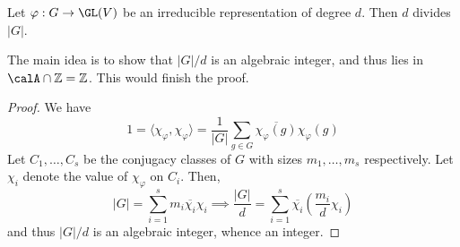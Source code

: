 \begin{theorem}
    Let $\varphi: G\to\GL(V)$ be an irreducible representation of degree $d$. Then $d$ divides $|G|$.
\end{theorem}
The main idea is to show that $|G|/d$ is an algebraic integer, and thus lies in $\calA\cap\Z = \Z$. This would finish the proof.
\begin{proof}
    We have 
    \begin{equation*}
        1 = \langle\chi_\varphi,\chi_\varphi\rangle = \frac{1}{|G|}\sum_{g\in G}\overline{\chi_\varphi(g)}\chi_\varphi(g)
    \end{equation*}
    Let $C_1,\ldots,C_s$ be the conjugacy classes of $G$ with sizes $m_1,\ldots,m_s$ respectively. Let $\chi_i$ denote the value of $\chi_\varphi$ on $C_i$. Then,
    \begin{equation*}
        |G| = \sum_{i = 1}^s m_i\overline{\chi_i}\chi_i\implies\frac{|G|}{d} = \sum_{i = 1}^s \overline{\chi_i}\left(\frac{m_i}{d}\chi_i\right)
    \end{equation*}
    and thus $|G|/d$ is an algebraic integer, whence an integer.
\end{proof}